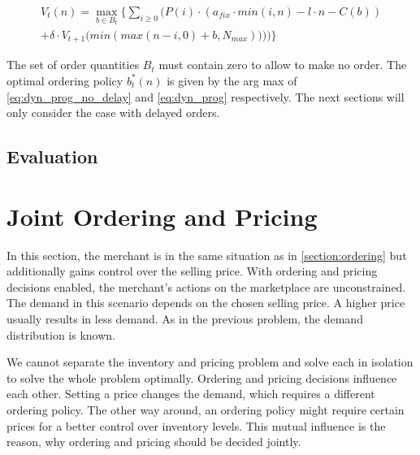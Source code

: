 \begin{equation}
\begin{split}
V_t(n) = \max_{b \in B_t} \Bigg\{
	\sum_{i \geq 0} \Big(
		P(i) \cdot (
			a_{fix} \cdot min(i, n) %
			- l \cdot n %
			- C(b) %
		) \\
		+ \delta \cdot V_{t+1}\big(min(max(n - i, 0) + b, N_{max}))\big)
	\Big)\Bigg\}
\end{split}
\label{eq:dyn_prog}
\end{equation}

The set of order quantities $B_t$ must contain zero to allow to make no order.
The optimal ordering policy $b_t^*(n)$ is given by the arg max of \cref{eq:dyn_prog_no_delay} and \cref{eq:dyn_prog} respectively.
The next sections will only consider the case with delayed orders.

\subsection{Evaluation}


\section{Joint Ordering and Pricing}
\label{section:joint_ordering_pricing}
In this section, the merchant is in the same situation as in \cref{section:ordering} but additionally gains control over the selling price.
With ordering and pricing decisions enabled, the merchant's actions on the marketplace are unconstrained.
The demand in this scenario depends on the chosen selling price.
A higher price usually results in less demand.
As in the previous problem, the demand distribution is known.

We cannot separate the inventory and pricing problem and solve each in isolation to solve the whole problem optimally.
Ordering and pricing decisions influence each other.
Setting a price changes the demand, which requires a different ordering policy.
The other way around, an ordering policy might require certain prices for a better control over inventory levels.
This mutual influence is the reason, why ordering and pricing should be decided jointly.

